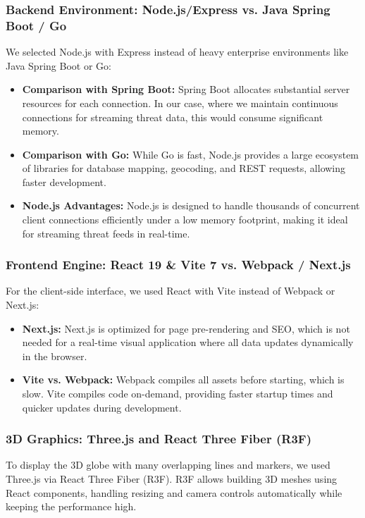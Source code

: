\subsubsection{Backend Environment: Node.js/Express vs. Java Spring Boot / Go}
We selected Node.js with Express instead of heavy enterprise environments like Java Spring Boot or Go:
\begin{itemize}
    \item \textbf{Comparison with Spring Boot:} Spring Boot allocates substantial server resources for each connection. In our case, where we maintain continuous connections for streaming threat data, this would consume significant memory.
    \item \textbf{Comparison with Go:} While Go is fast, Node.js provides a large ecosystem of libraries for database mapping, geocoding, and REST requests, allowing faster development.
    \item \textbf{Node.js Advantages:} Node.js is designed to handle thousands of concurrent client connections efficiently under a low memory footprint, making it ideal for streaming threat feeds in real-time.
\end{itemize}

\subsubsection{Frontend Engine: React 19 \& Vite 7 vs. Webpack / Next.js}
For the client-side interface, we used React with Vite instead of Webpack or Next.js:
\begin{itemize}
    \item \textbf{Next.js:} Next.js is optimized for page pre-rendering and SEO, which is not needed for a real-time visual application where all data updates dynamically in the browser.
    \item \textbf{Vite vs. Webpack:} Webpack compiles all assets before starting, which is slow. Vite compiles code on-demand, providing faster startup times and quicker updates during development.
\end{itemize}

\subsubsection{3D Graphics: Three.js and React Three Fiber (R3F)}
To display the 3D globe with many overlapping lines and markers, we used Three.js via React Three Fiber (R3F). R3F allows building 3D meshes using React components, handling resizing and camera controls automatically while keeping the performance high.

